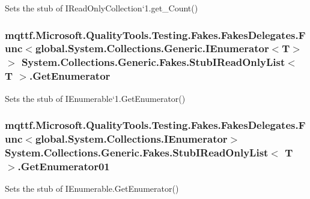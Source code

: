 Sets the stub of I\-Read\-Only\-Collection`1.get\-\_\-\-Count()

\hypertarget{class_system_1_1_collections_1_1_generic_1_1_fakes_1_1_stub_i_read_only_list_3_01_t_01_4_a302045c44d9556063fdda6ff66820ad6}{
\subsubsection[{Get\-Enumerator}]{\setlength{\rightskip}{0pt plus 5cm}mqttf.\-Microsoft.\-Quality\-Tools.\-Testing.\-Fakes.\-Fakes\-Delegates.\-Func$<$global.\-System.\-Collections.\-Generic.\-I\-Enumerator$<$T$>$ $>$ System.\-Collections.\-Generic.\-Fakes.\-Stub\-I\-Read\-Only\-List$<$ T $>$.Get\-Enumerator}}\label{class_system_1_1_collections_1_1_generic_1_1_fakes_1_1_stub_i_read_only_list_3_01_t_01_4_a302045c44d9556063fdda6ff66820ad6}


Sets the stub of I\-Enumerable`1.Get\-Enumerator()

\hypertarget{class_system_1_1_collections_1_1_generic_1_1_fakes_1_1_stub_i_read_only_list_3_01_t_01_4_af1efd1eeec29971bec082b35a8cb06b8}{
\subsubsection[{Get\-Enumerator01}]{\setlength{\rightskip}{0pt plus 5cm}mqttf.\-Microsoft.\-Quality\-Tools.\-Testing.\-Fakes.\-Fakes\-Delegates.\-Func$<$global.\-System.\-Collections.\-I\-Enumerator$>$ System.\-Collections.\-Generic.\-Fakes.\-Stub\-I\-Read\-Only\-List$<$ T $>$.Get\-Enumerator01}}\label{class_system_1_1_collections_1_1_generic_1_1_fakes_1_1_stub_i_read_only_list_3_01_t_01_4_af1efd1eeec29971bec082b35a8cb06b8}


Sets the stub of I\-Enumerable.\-Get\-Enumerator()

